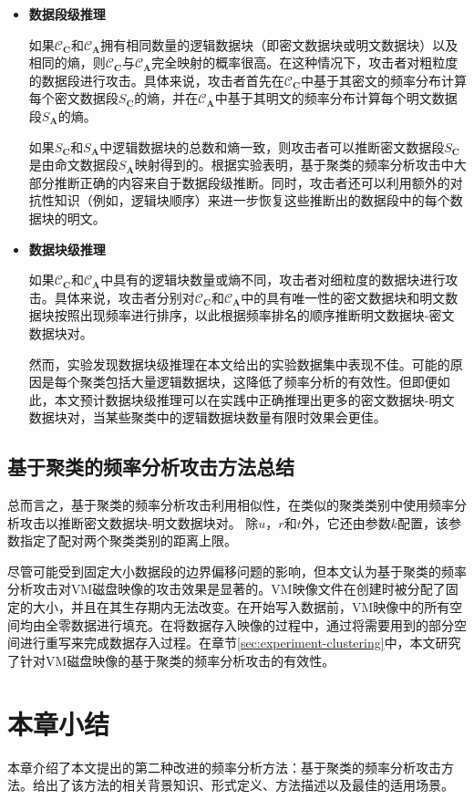 \begin{itemize}
    \item \textbf{数据段级推理}
    
    \par 如果$\mathcal{C}_\mathbf{C}$和$\mathcal{C}_\mathbf{A}$拥有相同数量的逻辑数据块（即密文数据块或明文数据块）以及相同的熵，则$\mathcal{C}_\mathbf{C}$与$\mathcal{C}_\mathbf{A}$完全映射的概率很高。在这种情况下，攻击者对粗粒度的数据段进行攻击。具体来说，攻击者首先在$\mathcal{C}_\mathbf{C}$中基于其密文的频率分布计算每个密文数据段$S_\mathbf{C}$的熵，并在$\mathcal{C}_\mathbf{A}$中基于其明文的频率分布计算每个明文数据段$S_\mathbf{A}$的熵。
         
         
    \par 如果$S_\mathbf{C}$和$S_\mathbf{A}$中逻辑数据块的总数和熵一致，则攻击者可以推断密文数据段$S_\mathbf{C}$是由命文数据段$S_\mathbf{A}$映射得到的。根据实验表明，基于聚类的频率分析攻击中大部分推断正确的内容来自于数据段级推断。同时，攻击者还可以利用额外的对抗性知识（例如，逻辑块顺序）来进一步恢复这些推断出的数据段中的每个数据块的明文。
         
    \item \textbf{数据块级推理}
    
    
    \par 如果$\mathcal{C}_\mathbf{C}$和$\mathcal{C}_\mathbf{A}$中具有的逻辑块数量或熵不同，攻击者对细粒度的数据块进行攻击。具体来说，攻击者分别对$\mathcal{C}_\mathbf{C}$和$\mathcal{C}_\mathbf{A}$中的具有唯一性的密文数据块和明文数据块按照出现频率进行排序，以此根据频率排名的顺序推断明文数据块-密文数据块对。            
     
    \par 然而，实验发现数据块级推理在本文给出的实验数据集中表现不佳。可能的原因是每个聚类包括大量逻辑数据块，这降低了频率分析的有效性。但即便如此，本文预计数据块级推理可以在实践中正确推理出更多的密文数据块-明文数据块对，当某些聚类中的逻辑数据块数量有限时效果会更佳。
 
\end{itemize}

\subsection{基于聚类的频率分析攻击方法总结}

总而言之，基于聚类的频率分析攻击利用相似性，在类似的聚类类别中使用频率分析攻击以推断密文数据块-明文数据块对。 除$u$，$r$和$t$外，它还由参数$k$配置，该参数指定了配对两个聚类类别的距离上限。

尽管可能受到固定大小数据段的边界偏移问题的影响，但本文认为基于聚类的频率分析攻击对VM磁盘映像的攻击效果是显著的。VM映像文件在创建时被分配了固定的大小，并且在其生存期内无法改变。在开始写入数据前，VM映像中的所有空间均由全零数据进行填充。在将数据存入映像的过程中，通过将需要用到的部分空间进行重写来完成数据存入过程。在章节\ref{sec:experiment-clustering}中，本文研究了针对VM磁盘映像的基于聚类的频率分析攻击的有效性。

\section{本章小结}

本章介绍了本文提出的第二种改进的频率分析方法：基于聚类的频率分析攻击方法。给出了该方法的相关背景知识、形式定义、方法描述以及最佳的适用场景。                  



